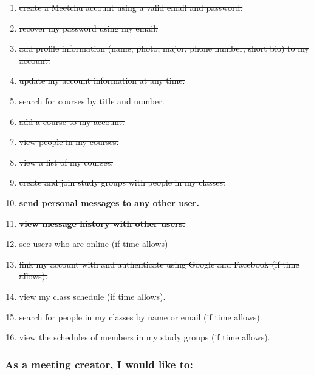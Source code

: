 \documentclass[12pt]{article}
\begin{document}
\begin{enumerate}[nolistsep]
    \item \st{create a Meetchu account using a valid email and password.}
    \item \st{recover my password using my email.}
    \item \st{add profile information (name, photo, major, phone number, short bio) to my account.}
    \item \st{update my account information at any time.}
    \item \st{search for courses by title and number.}
    \item \st{add a course to my account.}
    \item \st{view people in my courses.}
    \item \st{view a list of my courses.}
    \item \st{create and join study groups with people in my classes.}
    \item \textbf{\st{send personal messages to any other user.}}
    \item \textbf{\st{view message history with other users.}}
    \item see users who are online (if time allows)
    \item \st{link my account with and authenticate using Google and Facebook (if time allows).}
    \item view my class schedule (if time allows).
    \item search for people in my classes by name or email (if time allows).
    \item view the schedules of members in my study groups (if time allows).
\end{enumerate}

\subsubsection*{As a meeting creator, I would like to:}
\end{document}
